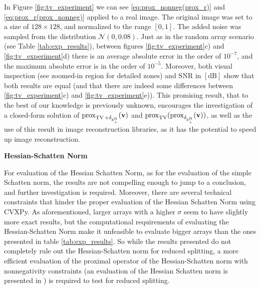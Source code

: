In Figure \ref{fig:tv_experiment} we can see \eqref{eq:prox_nonneg(prox_r)} and \eqref{eq:prox_r(prox_nonneg)} applied to a real image. The original image was set to a size of $128 \times 128$, and normalized to the range $[0, 1]$. The added noise was sampled from the distribution $\mathcal{N}(0, 0.08)$. Just as in the random array scenario (see Table \ref{tab:exp_results}), between figures \ref{fig:tv_experiment}c) and \ref{fig:tv_experiment}d) there is an average absolute error in the order of $10^{-7}$, and the maximum absolute error is in the order of $10^{-5}$. Moreover, both visual inspection (see zoomed-in region for detailed zones) and $\mathrm{SNR}$ in $\operatorname{[dB]}$ show that both results are equal (and that there are indeed some differences between \ref{fig:tv_experiment}c) and \ref{fig:tv_experiment}e)). This promising result, that to the best of our knowledge is previously unknown, encourages the investigation of a closed-form solution of $\mathrm{prox}_{\operatorname{TV} + \delta_{\rm \mathbb{R}_+^N}}(\mathbf{v})$  and $\mathrm{prox}_{\operatorname{TV}}(\mathrm{prox}_{\delta_{\rm \mathbb{R}_+^N}}(\mathbf{v}))$, as well as the use of this result in image reconstruction libraries, as it has the potential to speed up image reconstruction.  

\noindent\textbf{Hessian-Schatten Norm}

For evaluation of the Hessian Schatten Norm, as for the evaluation of the simple Schatten norm, the results are not compelling enough to jump to a conclusion, and further investigation is required. Moreover, there are several technical constraints that hinder the proper evaluation of the Hessian Schatten Norm using CVXPy. As aforementioned, larger arrays with a higher $\sigma$ seem to have slightly more exact results, but the computational requirements of evaluating the Hessian-Schatten Norm make it unfeasible to evaluate bigger arrays than the ones presented in table \ref{tab:exp_results}. So while the results presented do not completely rule out the Hessian-Schatten norm for reduced splitting, a more efficient evaluation of the proximal operator of the Hessian-Schatten norm with nonnegativity constraints (an evaluation of the Hessian Schatten norm is presented in \cite{lefkimmiatis_poisson_2013}) is required to test for reduced splitting. 

